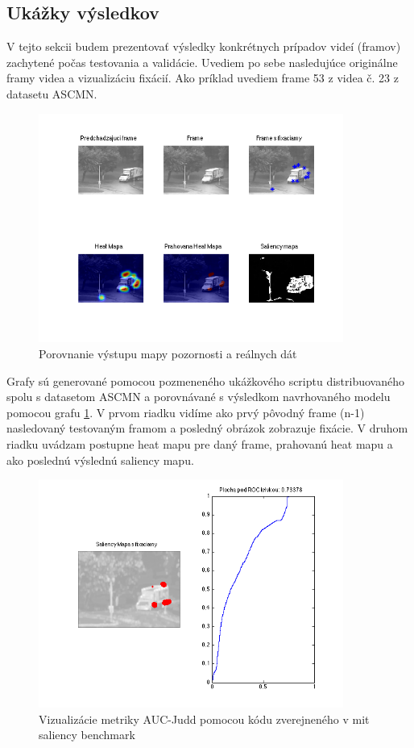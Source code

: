 \subsection{Ukážky výsledkov}
V tejto sekcii budem prezentovať výsledky konkrétnych prípadov videí (framov) zachytené počas testovania a validácie.
Uvediem po sebe nasledujúce originálne framy videa a vizualizáciu fixácií. Ako príklad uvediem frame 53 z videa č. 23 z datasetu ASCMN\cite{accv}.
\begin{figure}[H]
  \centering
  \includegraphics[width=10cm]{pics/ACCV-23-54-compare.png}
  \caption{Porovnanie výstupu mapy pozornosti a reálnych dát}
  \label{fig:ASCMN-53-23}
  \vspace{10mm}
\end{figure}
Grafy sú generované pomocou pozmeneného ukážkového scriptu distribuovaného spolu s datasetom ASCMN\cite{accv} a porovnávané s výsledkom navrhovaného modelu pomocou grafu \ref{fig:ASCMN-53-23}.
V prvom riadku vidíme ako prvý pôvodný frame (n-1) nasledovaný testovaným framom a posledný obrázok zobrazuje fixácie.
V druhom riadku uvádzam postupne heat mapu pre daný frame, prahovanú heat mapu a ako poslednú výslednú saliency mapu.

\begin{figure}[H]
  \centering
  \includegraphics[width=10cm]{pics/ACCV-23-54-AUC_Judd.png}
  \caption{Vizualizácie metriky AUC-Judd pomocou kódu zverejneného v mit saliency benchmark\cite{mit-saliency-benchmark}}
  \label{fig:ASCMN-53-23-AUC}
  \vspace{10mm}
\end{figure}


